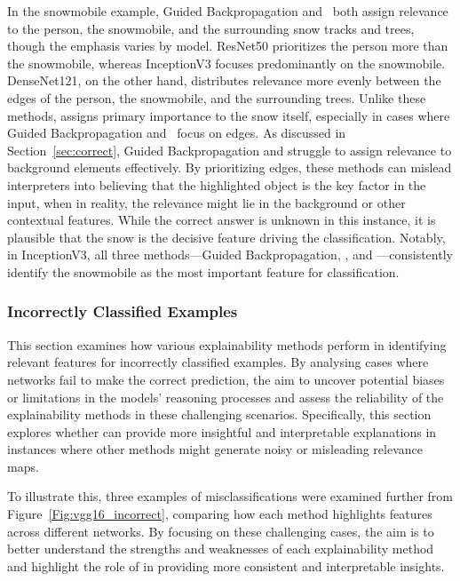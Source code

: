 In the snowmobile example, Guided Backpropagation and \LRP\ both assign relevance to the person, the snowmobile, and the surrounding snow tracks and trees, though the emphasis varies by model. ResNet50 prioritizes the person more than the snowmobile, whereas InceptionV3 focuses predominantly on the snowmobile. DenseNet121, on the other hand, distributes relevance more evenly between the edges of the person, the snowmobile, and the surrounding trees. Unlike these methods, \CTC\/ assigns primary importance to the snow itself, especially in cases where Guided Backpropagation and \LRP\ focus on edges. As discussed in Section~\ref{sec:correct}, Guided Backpropagation and \LRP\/ struggle to assign relevance to background elements effectively. By prioritizing edges, these methods can mislead interpreters into believing that the highlighted object is the key factor in the input, when in reality, the relevance might lie in the background or other contextual features. While the correct answer is unknown in this instance, it is plausible that the snow is the decisive feature driving the classification. Notably, in InceptionV3, all three methods—Guided Backpropagation, \LRP\/, and \CTC\/—consistently identify the snowmobile as the most important feature for classification.


\subsubsection{Incorrectly Classified Examples}

This section examines how various explainability methods perform in identifying relevant features for incorrectly classified examples. By analysing cases where networks fail to make the correct prediction, the aim to uncover potential biases or limitations in the models’ reasoning processes and assess the reliability of the explainability methods in these challenging scenarios. Specifically, this section explores whether \CTC\/ can provide more insightful and interpretable explanations in instances where other methods might generate noisy or misleading relevance maps. 

To illustrate this, three examples of misclassifications were examined further from Figure~\ref{Fig:vgg16_incorrect}, comparing how each method highlights features across different networks. By focusing on these challenging cases, the aim is to better understand the strengths and weaknesses of each explainability method and highlight the role of \CTC\/ in providing more consistent and interpretable insights.


